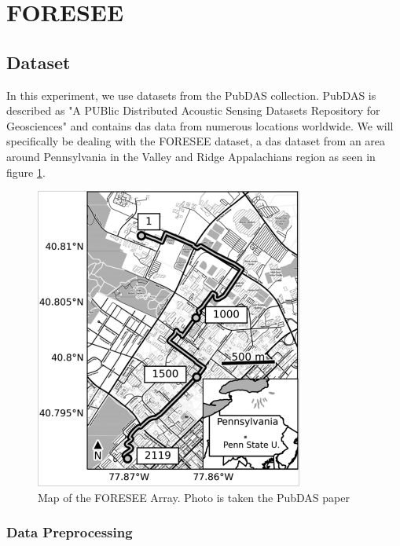 \section{FORESEE}

\subsection{Dataset}

In this experiment, we use datasets from the PubDAS \cite{spica2023pubdas} collection. PubDAS is described as "A PUBlic Distributed Acoustic Sensing Datasets Repository for Geosciences" and contains \acrshort{das} data from numerous locations worldwide. We will specifically be dealing with the FORESEE \cite{zhu2019penn} dataset, a \acrshort{das} dataset from an area around Pennsylvania in the Valley and Ridge Appalachians region as seen in figure \ref{fig:foresee}. \\

\begin{figure}[!h]
    \centering
    \includegraphics[width=0.5\linewidth]{figures/foresee.png}
    \caption{Map of the FORESEE Array. Photo is taken the PubDAS paper \cite{spica2023pubdas}}
    \label{fig:foresee}
\end{figure}

\subsubsection{Data Preprocessing}
\label{exp:fordata}

